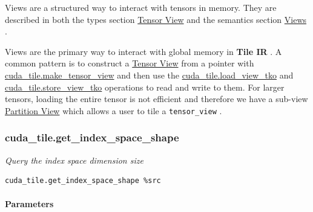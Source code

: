 \documentclass{article}
\begin{document}
Views are a structured way to interact with tensors in memory. They are described in both the types section \href{https://docs.nvidia.com/cuda/tile-ir/latest/sections/types.html#sub-sec-view-types}{Tensor View} and the semantics section \href{https://docs.nvidia.com/cuda/tile-ir/latest/sections/semantics.html#section-semantics-sub-section-views}{Views} .


Views are the primary way to interact with global memory in \textbf{Tile IR} . A common pattern is to construct a \href{https://docs.nvidia.com/cuda/tile-ir/latest/sections/types.html#type-tensor-view}{Tensor View} from a pointer with \href{https://docs.nvidia.com/cuda/tile-ir/latest/sections/operations.html#op-cuda-tile-make-tensor-view}{cuda\_tile.make\_tensor\_view} and then use the \href{https://docs.nvidia.com/cuda/tile-ir/latest/sections/operations.html#op-cuda-tile-load-view-tko}{cuda\_tile.load\_view\_tko} and \href{https://docs.nvidia.com/cuda/tile-ir/latest/sections/operations.html#op-cuda-tile-store-view-tko}{cuda\_tile.store\_view\_tko} operations to read and write to them. For larger tensors, loading the entire tensor is not efficient and therefore we have a sub-view \href{https://docs.nvidia.com/cuda/tile-ir/latest/sections/types.html#type-partition-view}{Partition View} which allows a user to tile a \texttt{tensor\_view} .


\subsubsection{cuda\_tile.get\_index\_space\_shape}

\textit{Query the index space dimension size}


\begin{lstlisting}
cuda_tile.get_index_space_shape %src
\end{lstlisting}

\paragraph{Parameters}
\end{document}
